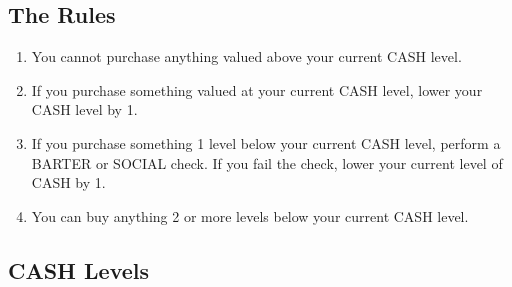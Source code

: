 \documentclass[
  letterpaper,
  DIV=11,
  numbers=noendperiod]{scrartcl}
\begin{document}
\subsection{The Rules}\label{the-rules}

\begin{enumerate}
\def\labelenumi{\arabic{enumi}.}
\item
  You cannot purchase anything valued above your current CASH level.
\item
  If you purchase something valued at your current CASH level, lower
  your CASH level by 1.
\item
  If you purchase something 1 level below your current CASH level,
  perform a BARTER or SOCIAL check. If you fail the check, lower your
  current level of CASH by 1.
\item
  You can buy anything 2 or more levels below your current CASH level.
\end{enumerate}

\subsection{CASH Levels}\label{cash-levels}
\end{document}
